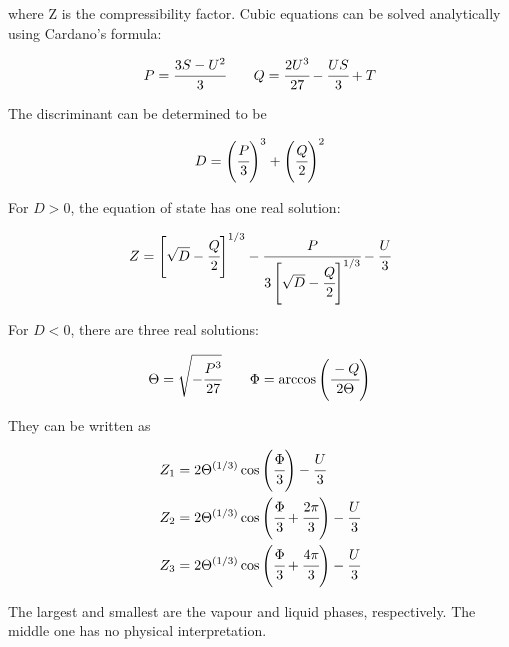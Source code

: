 \documentclass[a4paper,fleqn]{cas-dc}
\begin{document}
where Z is the compressibility factor. Cubic equations can be solved analytically using Cardano's formula:

{\footnotesize
	\begin{equation*}
		P = \cfrac{3S-U^2}{3} \qquad Q = \cfrac{2U^3}{27}-\cfrac{US}{3} + T
	\end{equation*}
}

The discriminant can be determined to be

{\footnotesize
	\begin{equation}
		D = \left( \cfrac{P}{3} \right)^3 + \left( \cfrac{Q}{2} \right)^2
	\end{equation}
}

For $D>0$, the equation of state has one real solution:

{\footnotesize
	\begin{equation}
		Z = \left[ \sqrt{D} - \cfrac{Q}{2} \right]^{1/3} - \cfrac{P}{ 3 \left[ \sqrt{D}-\cfrac{Q}{2} \right]^{1/3} } - \cfrac{U}{3}
	\end{equation}
}

For $D<0$, there are three real solutions:

{\footnotesize
	\begin{equation*}
		\Theta = \sqrt{-\cfrac{P^3}{27}} \qquad \Phi = \arccos\left( \cfrac{-Q}{2\Theta} \right)
	\end{equation*}
}

They can be written as

{\footnotesize
	\begin{align}
		Z_1 &= 2\Theta^{(1/3)} \cos \left( \cfrac{\Phi}{3} \right) - \cfrac{U}{3} \\
		Z_2 &= 2\Theta^{(1/3)} \cos \left( \cfrac{\Phi}{3} + \cfrac{2\pi}{3} \right) - \cfrac{U}{3} \\
		Z_3 &= 2\Theta^{(1/3)} \cos \left( \cfrac{\Phi}{3} + \cfrac{4\pi}{3} \right) - \cfrac{U}{3} 
	\end{align}
}

The largest and smallest are the vapour and liquid phases, respectively. The middle one has no physical interpretation.

\newpage
\end{document}
